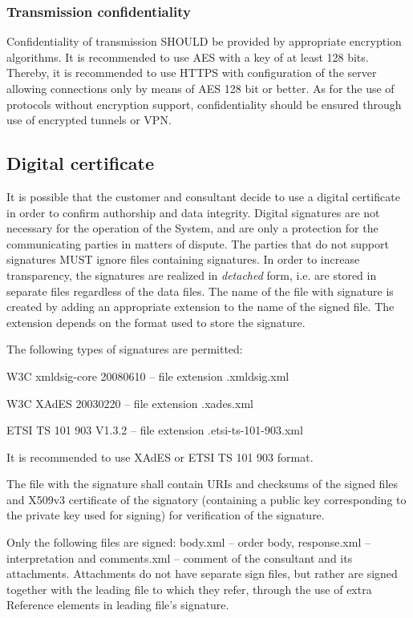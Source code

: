 \documentclass[a4paper]{article}
\begin{document}
\subsubsection{Transmission confidentiality}

Confidentiality of transmission SHOULD be provided by appropriate encryption algorithms. 
It is recommended to use AES with a key of at least 128 bits. Thereby, it is recommended 
to use HTTPS with configuration of the server allowing connections only by means of AES 128 
bit or better. As for the use of protocols without encryption support, confidentiality 
should be ensured through use of encrypted tunnels or VPN.

\subsection{Digital certificate}
\label{sec:sig}

It is possible that the customer and consultant decide to use a digital certificate in order 
to confirm authorship and data integrity. Digital signatures are not necessary for the operation 
of the System, and are only a protection for the communicating parties in matters of dispute. 
The parties that do not support signatures MUST ignore files containing signatures. In order 
to increase transparency, the signatures are realized in \emph{detached} form, i.e. are stored 
in separate files regardless of the data files. The name of the file with signature is created 
by adding an appropriate extension to the name of the signed file. The extension depends on 
the format used to store the signature.

The following types of signatures are permitted:
\begin{description}
\item W3C xmldsig-core 20080610 – file extension .xmldsig.xml
\item W3C XAdES 20030220 – file extension .xades.xml
\item ETSI TS 101 903 V1.3.2 – file extension .etsi-ts-101-903.xml      
\end{description}

It is recommended to use XAdES or ETSI TS 101 903 format.

The file with the signature shall contain URIs and checksums of the signed files and 
X509v3 certificate of the signatory (containing a public key corresponding to the private key 
used for signing) for verification of the signature.

Only the following files are signed: body.xml – order body, response.xml – interpretation 
and comments.xml – comment of the consultant and its attachments. Attachments do not have 
separate sign files, but rather are signed together with the leading file to which they 
refer, through the use of extra Reference elements in leading file's signature.
\end{document}
